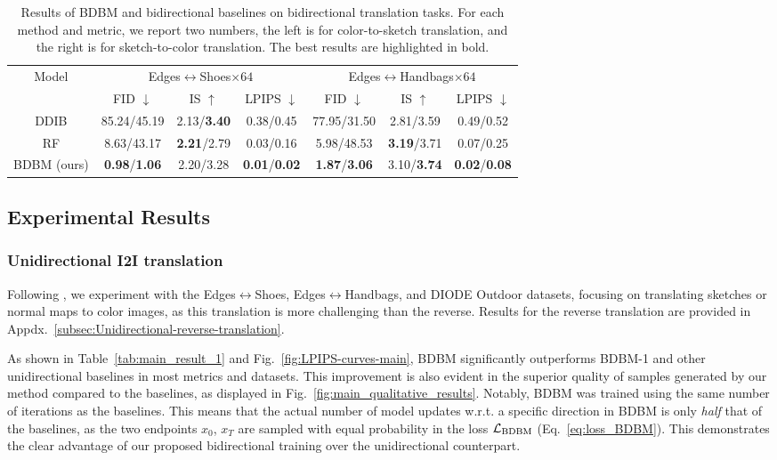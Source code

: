 \begin{table*}
\begin{centering}
\begin{tabular}{ccccccc}
\toprule 
\multirow{2}{*}{Model} & \multicolumn{3}{c}{Edges$\leftrightarrow$Shoes$\times64$} & \multicolumn{3}{c}{Edges$\leftrightarrow$Handbags$\times64$}\tabularnewline
\cmidrule{2-7} 
 & FID $\downarrow$ & IS $\uparrow$ & LPIPS $\downarrow$ & FID $\downarrow$ & IS $\uparrow$ & LPIPS $\downarrow$\tabularnewline
\midrule
\midrule 
DDIB & 85.24/45.19 & 2.13/\textbf{3.40} & 0.38/0.45 & 77.95/31.50 & 2.81/3.59 & 0.49/0.52\tabularnewline
\midrule 
RF & 8.63/43.17 & \textbf{2.21}/2.79 & 0.03/0.16 & 5.98/48.53 & \textbf{3.19}/3.71 & 0.07/0.25\tabularnewline
\midrule
\midrule 
BDBM (ours) & \textbf{0.98}/\textbf{1.06} & 2.20/3.28 & \textbf{0.01}/\textbf{0.02} & \textbf{1.87}/\textbf{3.06} & 3.10/\textbf{3.74} & \textbf{0.02}/\textbf{0.08}\tabularnewline
\bottomrule
\end{tabular}
\par\end{centering}
\caption{Results of BDBM and bidirectional baselines on bidirectional translation
tasks. For each method and metric, we report two numbers, the left
is for color-to-sketch translation, and the right is for sketch-to-color
translation. The best results are highlighted in bold.\label{tab:main_result_2}}
\end{table*}


\subsection{Experimental Results}

\subsubsection{Unidirectional I2I translation\label{subsec:Unidirectional-I2I-Translation}}

Following \cite{zhou2024denoising}, we experiment with the Edges$\leftrightarrow$Shoes,
Edges$\leftrightarrow$Handbags, and DIODE Outdoor datasets, focusing
on translating sketches or normal maps to color images, as this translation
is more challenging than the reverse. Results for the reverse translation
are provided in Appdx.~\ref{subsec:Unidirectional-reverse-translation}.

As shown in Table~\ref{tab:main_result_1} and Fig.~\ref{fig:LPIPS-curves-main},
BDBM significantly outperforms BDBM-1 and other unidirectional baselines
in most metrics and datasets. This improvement is also evident in
the superior quality of samples generated by our method compared to
the baselines, as displayed in Fig.~\ref{fig:main_qualitative_results}.
Notably, BDBM was trained using the same number of iterations as the
baselines. This means that the actual number of model updates w.r.t.
a specific direction in BDBM is only \emph{half} that of the baselines,
as the two endpoints $x_{0}$, $x_{T}$ are sampled with equal probability
in the loss $\mathcal{L}_{\text{BDBM}}$ (Eq.~\ref{eq:loss_BDBM}). This
demonstrates the clear advantage of our proposed bidirectional training
over the unidirectional counterpart.

